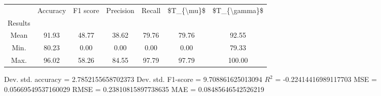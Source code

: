 \begin{tabular}{|c|c|c|c|c|c|c|}
\toprule
{} &  Accuracy &  F1 score &  Precision &  Recall &  \$T\_\{\textbackslash mu\}\$ &  \$T\_\{\textbackslash gamma\}\$ \\
Results &           &           &            &         &            &               \\
\hline
Mean    &     91.93 &     48.77 &      38.62 &   79.76 &      79.76 &         92.55 \\
Min.    &     80.23 &      0.00 &       0.00 &    0.00 &       0.00 &         79.33 \\
Max.    &     96.02 &     58.26 &      84.55 &   97.79 &      97.79 &        100.00 \\
\bottomrule
\end{tabular}

 Dev. std. accuracy = 2.7852155658702373
 Dev. std. F1-score = 9.708861625013094
 $R^2$ = -0.22414416989117703
 MSE = 0.05669549537160029
 RMSE = 0.23810815897738635
 MAE = 0.08485646542526219